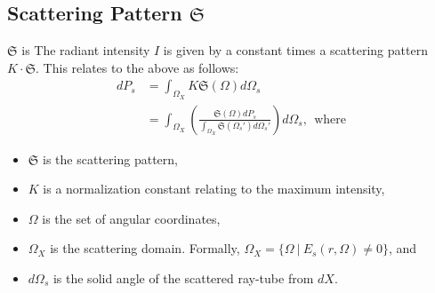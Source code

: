 \documentclass{article}
\begin{document}
\subsection{Scattering Pattern $\mathfrak{S}$} %
$\mathfrak{S}$ is 
The radiant intensity $I$ is given by a constant times a scattering pattern $K \cdot
\mathfrak{S}$. This relates to the above as follows:
\begin{align}
   dP_s &= \int_{\Omega_X} K\mathfrak{S}( \Omega ) d \Omega_s \\
   &= \int_{\Omega_X}\left( \frac{\mathfrak{S}(\Omega) dP_s }{ \int_{\Omega_X}
      \mathfrak{S}(\Omega_s') d \Omega_s' } \right) d \Omega_s, \ \ \text{where}
      \nonumber 
\end{align}
\begin{itemize}
   \item $\mathfrak{S}$ is the scattering pattern,
   \item $K$ is a normalization constant relating to the maximum intensity,
   \item $\Omega$ is the set of angular coordinates,
   \item $\Omega_X$ is the scattering domain. Formally, $\Omega_X = \{ \Omega \
      | \ E_s(r, \Omega) \neq 0 \}$, and
   \item $d \Omega_s$ is the solid angle of the scattered ray-tube from $dX$.
\end{itemize}


\renewcommand{\thesection}{\arabic{section}}
\setcounter{section}{0}
\setcounter{equation}{0}
\newpage
\end{document}
